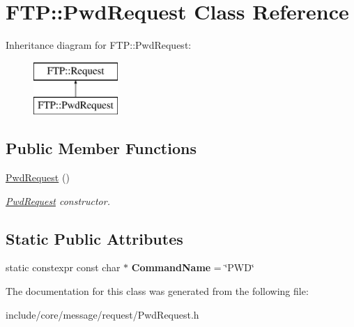 \hypertarget{class_f_t_p_1_1_pwd_request}{\section{F\-T\-P\-:\-:Pwd\-Request Class Reference}
\label{class_f_t_p_1_1_pwd_request}
}
Inheritance diagram for F\-T\-P\-:\-:Pwd\-Request\-:\begin{figure}[H]
\begin{center}
\leavevmode
\includegraphics[height=2.000000cm]{class_f_t_p_1_1_pwd_request}
\end{center}
\end{figure}
\subsection*{Public Member Functions}
\begin{DoxyCompactItemize}
\item 
\hypertarget{class_f_t_p_1_1_pwd_request_a403b0aeb6e2ba118c808d16fbe3b78b9}{\hyperlink{class_f_t_p_1_1_pwd_request_a403b0aeb6e2ba118c808d16fbe3b78b9}{Pwd\-Request} ()}\label{class_f_t_p_1_1_pwd_request_a403b0aeb6e2ba118c808d16fbe3b78b9}

\begin{DoxyCompactList}\small\item\em \hyperlink{class_f_t_p_1_1_pwd_request}{Pwd\-Request} constructor. \end{DoxyCompactList}\end{DoxyCompactItemize}
\subsection*{Static Public Attributes}
\begin{DoxyCompactItemize}
\item 
\hypertarget{class_f_t_p_1_1_pwd_request_a5492dc00d110d1c8233af41d0f45c452}{static constexpr const char $\ast$ {\bfseries Command\-Name} = \char`\"{}P\-W\-D\char`\"{}}\label{class_f_t_p_1_1_pwd_request_a5492dc00d110d1c8233af41d0f45c452}

\end{DoxyCompactItemize}


The documentation for this class was generated from the following file\-:\begin{DoxyCompactItemize}
\item 
include/core/message/request/Pwd\-Request.\-h\end{DoxyCompactItemize}
